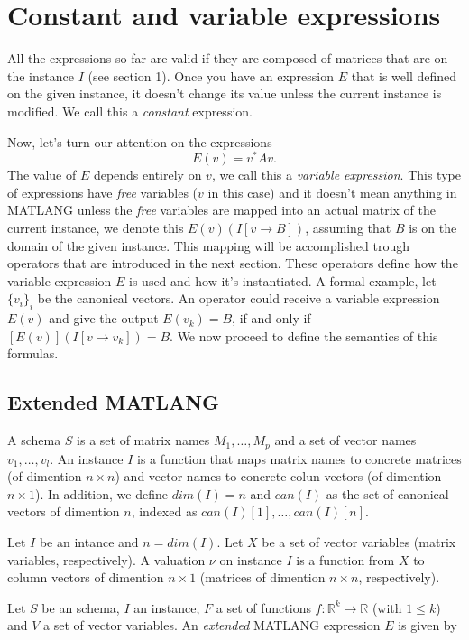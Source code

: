 \section{Constant and variable expressions}

All the expressions so far are valid if they are composed of matrices that are on the instance $I$ (see section 1). Once you have an expression $E$ that is well defined on the given instance, it doesn't change its value unless the current instance is modified. We call this a \textit{constant} expression.

Now, let's turn our attention on the expressions $$E(v)=v^* Av.$$ The value of $E$ depends entirely on $v$, we call this a \textit{variable expression}. This type of expressions have \textit{free} variables ($v$ in this case) and it doesn't mean anything in MATLANG unless the \textit{free} variables are mapped into an actual matrix of the current instance, we denote this $E(v)(I[v\rightarrow B])$, assuming that $B$ is on the domain of the given instance. This mapping will be accomplished trough operators that are introduced in the next section. These operators define how the variable expression $E$ is used and how it's instantiated.
A formal example, let $\lbrace v_i\rbrace_i$ be the canonical vectors. An operator could receive a variable expression $E(v)$ and give the output $E(v_k)=B$, if and only if $[E(v)](I[v\rightarrow v_k])=B$.
We now proceed to define the semantics of this formulas.

\subsection{Extended MATLANG}

A schema $S$ is a set of matrix names $M_1,\ldots, M_p$ and a set of vector names $v_1,\ldots, v_l$.
An instance $I$ is a function that maps matrix names to concrete matrices (of dimention $n\times n$) and vector names to concrete colun vectors (of dimention $n\times 1$). 
In addition, we define $dim(I)=n$ and $can(I)$ as the set of canonical vectors of dimention $n$, indexed as $can(I)[1], \ldots,can(I)[n]$.

Let $I$ be an intance and $n=dim(I)$. Let $X$ be a set of vector variables (matrix variables, respectively). A valuation $\nu$ on instance $I$ is a function from $X$ to column vectors of dimention $n\times 1$ (matrices of dimention $n\times n$, respectively). 

Let $S$ be an schema, $I$ an instance, $F$ a set of functions $f:\mathbb{R}^{k}\rightarrow\mathbb{R}$ (with $1\leq k$) and $V$ a set of vector variables. An \textit{extended} MATLANG expression $E$ is given by

